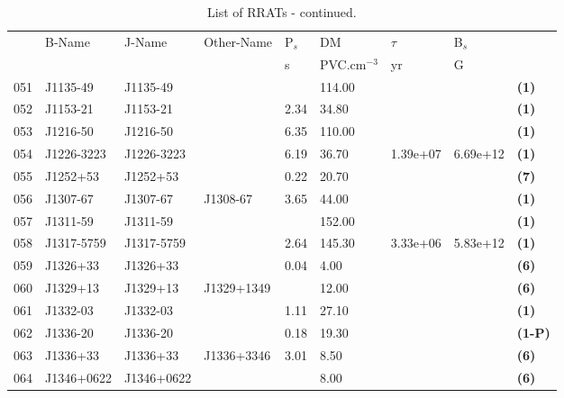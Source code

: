 \documentclass{jaa}
\begin{document}
%
\begin{table*} 
%
\caption{List of RRATs - continued.}
%
\label{t_list02}
%  
\begin{minipage}{0.95\textwidth}
%
\centering
\begin{tabular}{|l|l|l|l|l|l|l|l|l|} \toprule
     &  B-Name     & J-Name      & Other-Name  & P$_s$ &  DM    &  $\tau$    & B$_s$    &        \\
     &             &             &             &  s    & PVC.cm$^{-3}$ & yr    & G        &        \\ \midrule
 051 & J1135-49    & J1135-49    &             &       & 114.00 &            &          &  {\bf (1)}   \\ 
 052 & J1153-21    & J1153-21    &             &  2.34 &  34.80 &            &          &  {\bf (1)}   \\
 053 & J1216-50    & J1216-50    &             &  6.35 & 110.00 &            &          &  {\bf (1)}   \\
 054 & J1226-3223  & J1226-3223  &             &  6.19 &  36.70 &  1.39e+07  & 6.69e+12 &  {\bf (1)}   \\
 055 & J1252+53    & J1252+53    &             &  0.22 &  20.70 &            &          &  {\bf (7)}   \\
 056 & J1307-67    & J1307-67    &  J1308-67   &  3.65 &  44.00 &            &          &  {\bf (1)}   \\
 057 & J1311-59    & J1311-59    &             &       & 152.00 &            &          &  {\bf (1)}   \\
 058 & J1317-5759  & J1317-5759  &             &  2.64 & 145.30 &  3.33e+06  & 5.83e+12 &  {\bf (1)}   \\
 059 & J1326+33    & J1326+33    &             &  0.04 &   4.00 &            &          &  {\bf (6)}   \\
 060 & J1329+13    & J1329+13    & J1329+1349  &       &  12.00 &            &          &  {\bf (6)}   \\
 061 & J1332-03    & J1332-03    &             &  1.11 &  27.10 &            &          &  {\bf (1)}   \\
 062 & J1336-20    & J1336-20    &             &  0.18 &  19.30 &            &          &  {\bf (1-P)} \\
 063 & J1336+33    & J1336+33    &  J1336+3346 &  3.01 &   8.50 &            &          &  {\bf (6)}   \\
 064 & J1346+0622  & J1346+0622  &             &       &   8.00 &            &          &  {\bf (6)}   \\

\end{tabular}
\end{minipage}
\end{table*}
\end{document}
